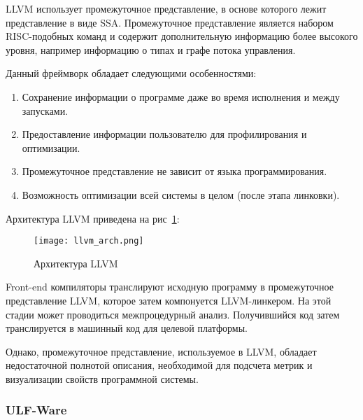 LLVM использует промежуточное представление, в основе которого лежит
представление в виде SSA. Промежуточное представление является набором
RISC-подобных команд и содержит дополнительную информацию более высокого уровня,
например информацию о типах и графе потока управления.

Данный фреймворк обладает следующими особенностями:

\begin{enumerate}
    \item Сохранение информации о программе даже во время исполнения и между
    запусками.
    \item Предоставление информации пользователю для профилирования и
    оптимизации.
    \item Промежуточное представление не зависит от языка программирования.
    \item Возможность оптимизации всей системы в целом (после этапа линковки).
\end{enumerate}

Архитектура LLVM приведена на рис~\ref{fig:llvm_arch}:

\newpage

\begin{figure}[h!]
    \begin{center}
        \texttt{[image: llvm\_arch.png]}
    \end{center}
    \caption{Архитектура LLVM}
    \label{fig:llvm_arch}
\end{figure}

Front-end компиляторы транслируют исходную программу в промежуточное
представление LLVM, которое затем компонуется LLVM-линкером. На этой стадии
может проводиться межпроцедурный анализ. Получившийся код затем транслируется
в машинный код для целевой платформы.

Однако, промежуточное представление, используемое в LLVM, обладает
недостаточной полнотой описания, необходимой для подсчета метрик и визуализации
свойств программной системы.

\subsubsection{ULF-Ware}


